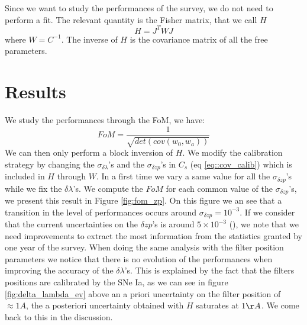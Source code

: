 \documentclass[\docopts]{\docclass}
\begin{document}
Since we want to study the performances of the survey, we do not need to perform a fit.
The relevant quantity is the Fisher matrix, that we call $H$
\begin{equation}
H = J^TWJ
\end{equation}
where $W = C^{-1}$.
The inverse of $H$ is the covariance matrix of all the free parameters.


\section{Results}
\label{sec::results}
We study the performances through the FoM, we have:
\begin{equation}
FoM = \frac{1}{\sqrt{det(cov(w_0, w_a))}}
\end{equation}
We can then only perform a block inversion of $H$.
We modify the calibration strategy by changing the $\sigma_{\delta \lambda}$'s and the $\sigma_{\delta zp}$'s in $C_s$ (eq \ref{eq::cov_calib}) which is included in $H$ through $W$.
In a first time we vary a same value for all the $\sigma_{\delta zp}$'s while we fix the $\delta \lambda$'s.
We compute the $FoM$ for each common value of the $\sigma_{\delta zp}$'s, we present this result in Figure \ref{fig:fom_zp}.
On this figure we an see that a transition in the level of performances occurs around $\sigma_{\delta zp} = 10^{-3}$.
If we consider that the current uncertainties on the $\delta zp$'s is around $5 \times 10^{-3}$ (\cite{1401.4064}), we note that we need improvements to extract the most information from the statistics granted by one year of the survey.
When doing the same analysis with the filter position parameters we notice that there is no evolution of the performances when improving the accuracy of the $\delta\lambda$'s. This is explained by the fact that the filters positions are calibrated by the SNe Ia, as we can see in figure \ref{fig:delta_lambda_ev} above an a priori uncertainty on the filter position of $\approx 1A$, the a posteriori uncertainty obtained with $H$ saturates at $1 \AA$. We come back to this in the discussion.
\end{document}
